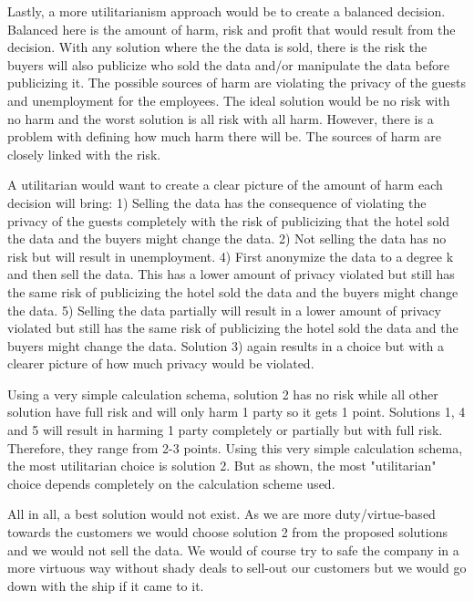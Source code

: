 Lastly, a more utilitarianism approach would be to create a balanced decision. Balanced here is the amount of harm, risk and profit that would result from the decision. With any solution where the the data is sold, there is the risk the buyers will also publicize who sold the data and/or manipulate the data before publicizing it. The possible sources of harm are violating the privacy of the guests and unemployment for the employees. The ideal solution would be no risk with no harm and the worst solution is all risk with all harm. However, there is a problem with defining how much harm there will be. The sources of harm are closely linked with the risk.

A utilitarian would want to create a clear picture of the amount of harm each decision will bring: 1) Selling the data has the consequence of violating the privacy of the guests completely with the risk of publicizing that the hotel sold the data and the buyers might change the data. 2) Not selling the data has no risk but will result in unemployment. 4) First anonymize the data to a degree k and then sell the data. This has a lower amount of privacy violated but still has the same risk of publicizing the hotel sold the data and the buyers might change the data. 5) Selling the data partially will result in a lower amount of privacy violated but still has the same risk of publicizing the hotel sold the data and the buyers might change the data. Solution 3) again results in a choice but with a clearer picture of how much privacy would be violated.

Using a very simple calculation schema, solution 2 has no risk while all other solution have full risk and will only harm 1 party so it gets 1 point. Solutions 1, 4 and 5 will result in harming 1 party completely or partially but with full risk. Therefore, they range from 2-3 points. Using this very simple calculation schema, the most utilitarian choice is solution 2. But as shown, the most "utilitarian" choice depends completely on the calculation scheme used.

All in all, a best solution would not exist. As we are more duty/virtue-based towards the customers we would choose solution 2 from the proposed solutions and we would not sell the data. We would of course try to safe the company in a more virtuous way without shady deals to sell-out our customers but we would go down with the ship if it came to it.
